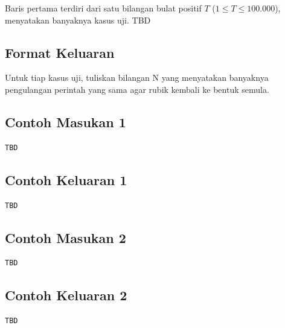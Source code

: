 \documentclass{article}
\begin{document}
Baris pertama terdiri dari satu bilangan bulat positif $T$ ($1 \leq T \leq 100.000$), menyatakan banyaknya kasus uji.
TBD

\subsection*{Format Keluaran}

Untuk tiap kasus uji, tuliskan bilangan N yang menyatakan banyaknya pengulangan perintah yang sama agar rubik kembali ke bentuk semula.
\\

\begin{multicols}{2}
\subsection*{Contoh Masukan 1}
\begin{lstlisting}
TBD
\end{lstlisting}
\columnbreak
\subsection*{Contoh Keluaran 1}
\begin{lstlisting}
TBD
\end{lstlisting}
\vfill
\null
\end{multicols}

\begin{multicols}{2}
\subsection*{Contoh Masukan 2}
\begin{lstlisting}
TBD
\end{lstlisting}
\columnbreak
\subsection*{Contoh Keluaran 2}
\begin{lstlisting}
TBD
\end{lstlisting}
\vfill
\null
\end{multicols}


\pagebreak
\end{document}
